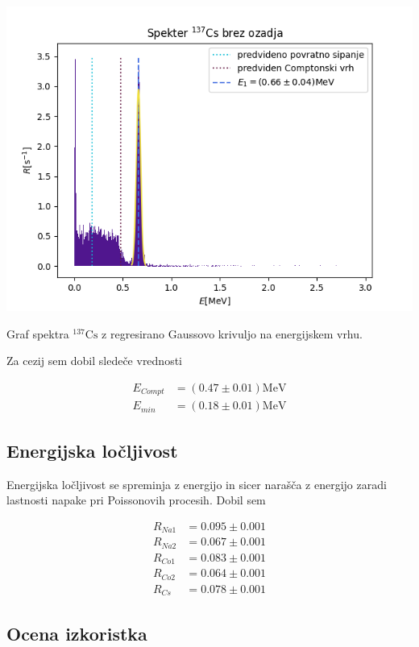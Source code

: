 \documentclass[11pt]{article}
\begin{document}
\begin{slika}[H]
\begin{center}
\includegraphics[width=.9\linewidth]{figures/Cs137_no_bg.png}
\caption{\small Graf spektra $^{137} \mathrm{Cs}$ z regresirano Gaussovo krivuljo na energijskem vrhu. }
\end{center}
\end{slika}

Za cezij sem dobil sledeče vrednosti

\begin{align*}
  E_{Compt} &= (0.47 \pm 0.01) \mathrm{MeV} \\
E_{min} &= (0.18 \pm 0.01) \mathrm{MeV}
\end{align*}
\subsection{Energijska ločljivost}\label{sec:orgfb9b95f}

Energijska ločljivost se spreminja z energijo in sicer narašča z energijo zaradi lastnosti napake pri Poissonovih procesih. Dobil sem

\begin{align*}
  R_{Na1} &= 0.095 \pm 0.001 \\
R_{Na2} &= 0.067 \pm 0.001 \\
R_{Co1} &= 0.083 \pm 0.001 \\
R_{Co2} &= 0.064 \pm 0.001 \\
R_{Cs} &= 0.078 \pm 0.001
\end{align*}
\subsection{Ocena izkoristka}\label{sec:orgb8fc457}
\end{document}
